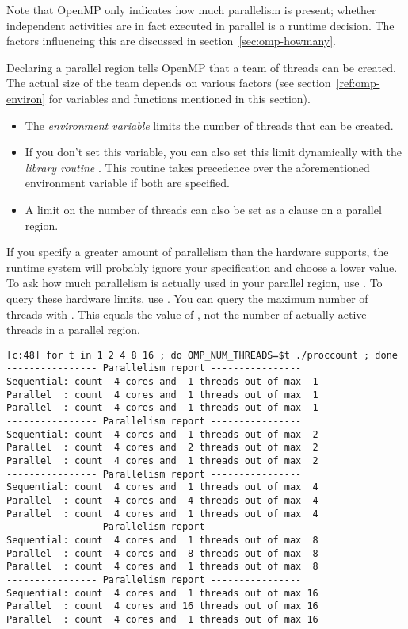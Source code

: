 Note that OpenMP only indicates how much parallelism is present;
whether independent activities are in fact executed in parallel
is a runtime decision. The factors influencing this are discussed
in section~\ref{sec:omp-howmany}.

Declaring a parallel region tells OpenMP that a team of threads can be created.
The actual size of the team depends on various factors (see section~\ref{ref:omp-environ}
for variables and functions mentioned in this section).
\begin{itemize}
\item The \emph{environment variable}
   limits the number of
  threads that can be created.
\item If you don't set this variable, you can also set this limit
  dynamically with the \emph{library routine} . This routine takes
  precedence over the aforementioned environment variable if both are
  specified.
\item A limit on the number of threads can also be set as a clause
  on a parallel region.
\end{itemize}
If you specify a greater amount of parallelism than the hardware supports,
the runtime system will probably ignore your specification and choose a lower value.
To ask how much parallelism is actually used in your parallel region,
use . To query these hardware limits,
use .
You can query the maximum number of threads with .
This equals the value of ,
not the number of actually active threads in a parallel region.

\begin{multicols}{2}
  \columnbreak
\tiny
\begin{verbatim}
[c:48] for t in 1 2 4 8 16 ; do OMP_NUM_THREADS=$t ./proccount ; done
---------------- Parallelism report ----------------
Sequential: count  4 cores and  1 threads out of max  1
Parallel  : count  4 cores and  1 threads out of max  1
Parallel  : count  4 cores and  1 threads out of max  1
---------------- Parallelism report ----------------
Sequential: count  4 cores and  1 threads out of max  2
Parallel  : count  4 cores and  2 threads out of max  2
Parallel  : count  4 cores and  1 threads out of max  2
---------------- Parallelism report ----------------
Sequential: count  4 cores and  1 threads out of max  4
Parallel  : count  4 cores and  4 threads out of max  4
Parallel  : count  4 cores and  1 threads out of max  4
---------------- Parallelism report ----------------
Sequential: count  4 cores and  1 threads out of max  8
Parallel  : count  4 cores and  8 threads out of max  8
Parallel  : count  4 cores and  1 threads out of max  8
---------------- Parallelism report ----------------
Sequential: count  4 cores and  1 threads out of max 16
Parallel  : count  4 cores and 16 threads out of max 16
Parallel  : count  4 cores and  1 threads out of max 16
\end{verbatim}
\end{multicols}

